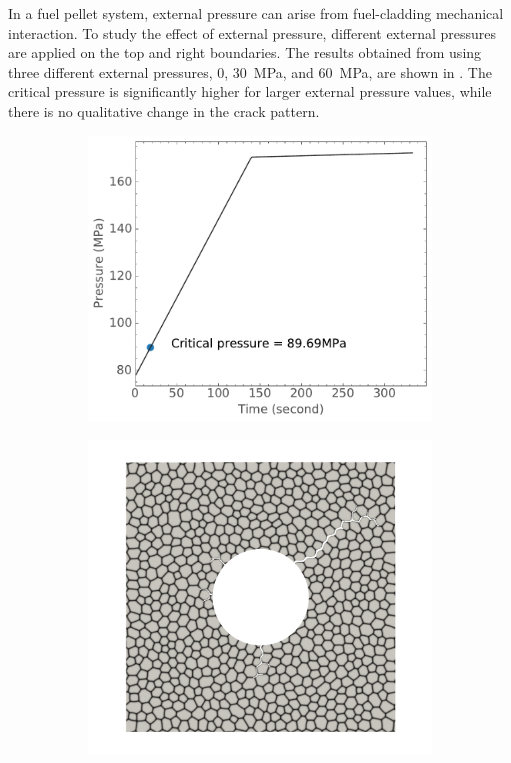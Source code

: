 In a fuel pellet system, external pressure can arise from fuel-cladding mechanical interaction. To study the effect of external pressure, different external pressures are applied on the top and right boundaries.  The results obtained from using three different external pressures, 0, \SI{30}{\mega\pascal}, and \SI{60}{\mega\pascal}, are shown in . The critical pressure is significantly higher for larger external pressure values, while there is no qualitative change in the crack pattern.

\begin{figure}[htb!]
  \centering
  \begin{subfigure}[t]{0.32\linewidth}
    \centering
    \includegraphics[width=\linewidth]{Chapter3/figures/bubble_pressure_r0.5_ext0_rod196}
    \caption{}
  \end{subfigure}
  \begin{subfigure}[t]{0.32\linewidth}
    \centering
    \includegraphics[width=\linewidth]{Chapter3/figures/r5_ext0}

\end{subfigure}
\end{figure}
